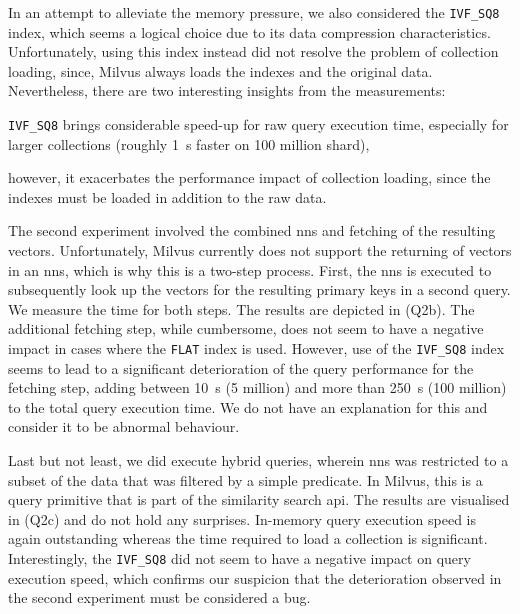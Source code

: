 In an attempt to alleviate the memory pressure, we also considered the \texttt{IVF\_SQ8} index, which seems a logical choice due to its data compression characteristics. Unfortunately, using this index instead did not resolve the problem of collection loading, since, Milvus always loads the indexes and the original data. Nevertheless, there are two interesting insights from the measurements:
\begin{enumerate*}[label=(\roman*)]
    \item \texttt{IVF\_SQ8} brings considerable speed-up for raw query execution time, especially for larger collections (roughly \SI{1}{\second} faster on 100 million shard),
    \item however, it exacerbates the performance impact of collection loading, since the indexes must be loaded in addition to the raw data.
\end{enumerate*}

The second experiment involved the combined \acrshort{nns} and fetching of the resulting vectors. Unfortunately, Milvus currently does not support the returning of vectors in an \acrshort{nns}, which is why this is a two-step process. First, the \acrshort{nns} is executed to subsequently look up the vectors for the resulting primary keys in a second query. We measure the time for both steps. The results are depicted in  (Q2b). The additional fetching step, while cumbersome, does not seem to have a negative impact in cases where the \texttt{FLAT} index is used. However, use of the \texttt{IVF\_SQ8} index seems to lead to a significant deterioration of the query performance for the fetching step, adding between \SI{10}{\second} (5 million) and more than \SI{250}{\second} (100 million) to the total query execution time. We do not have an explanation for this and consider it to be abnormal behaviour.

Last but not least, we did execute hybrid queries, wherein \acrshort{nns} was restricted to a subset of the data that was filtered by a simple predicate. In Milvus, this is a query primitive that is part of the similarity search \acrshort{api}. The results are visualised in  (Q2c) and do not hold any surprises. In-memory query execution speed is again outstanding whereas the time required to load a collection is significant. Interestingly, the \texttt{IVF\_SQ8} did not seem to have a negative impact on query execution speed, which confirms our suspicion that the deterioration observed in the second experiment must be considered a bug. 

